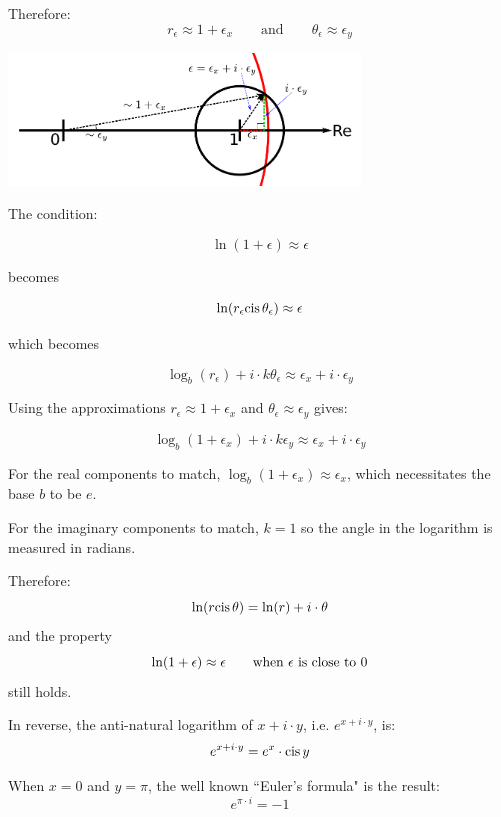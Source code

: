 \documentclass{article}
\newcommand{\cis}{\textnormal{cis}\,}
\begin{document}
Therefore:
\[r_\epsilon \approx 1 + \epsilon_x \quad\quad\text{and}\quad\quad \theta_\epsilon \approx \epsilon_y\]

\begin{center}
\includegraphics[width = 0.7\textwidth]{complex_number_natural_logarithm}
\end{center}

The condition:

\[\ln(1 + \epsilon) \approx \epsilon\] 

becomes

\[\ln(r_\epsilon \cis\theta_\epsilon) \approx \epsilon\] 

which becomes

\[\log_b(r_\epsilon) + i \cdot k\theta_\epsilon \approx \epsilon_x + i \cdot \epsilon_y\]

Using the approximations \(r_\epsilon \approx 1 + \epsilon_x\) and \(\theta_\epsilon \approx \epsilon_y\) gives:

\[\log_b(1 + \epsilon_x) + i \cdot k\epsilon_y \approx \epsilon_x + i \cdot \epsilon_y\]

For the real components to match, \(\log_b(1 + \epsilon_x) \approx \epsilon_x\), which necessitates the base \(b\) to be \(e\). 

For the imaginary components to match, \(k = 1\) so the angle in the logarithm is measured in radians. 

Therefore:
\[\ln(r \cis\theta) = \ln(r) + i \cdot \theta\]
and the property
\[\ln(1 + \epsilon) \approx \epsilon \quad\quad\textnormal{when \(\epsilon\) is close to \(0\)}\]
still holds. 

In reverse, the anti-natural logarithm of \(x + i \cdot y\), i.e. \(e^{x + i \cdot y}\), is:
\[e^{x + i \cdot y} = e^x \cdot \cis y\]

When \(x = 0\) and \(y = \pi\), the well known ``Euler's formula" is the result:
\[e^{\pi \cdot i} = -1\]
\end{document}
